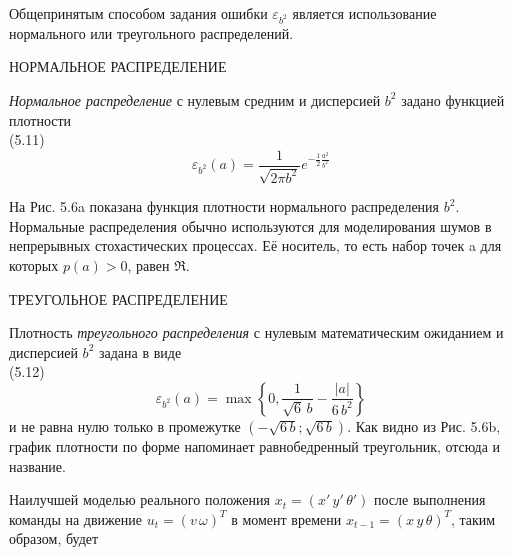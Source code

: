 \documentclass[10pt,a4paper]{article}
\begin{document}
Общепринятым способом задания ошибки $\varepsilon_{b^2}$ является использование нормального или треугольного распределений.

НОРМАЛЬНОЕ РАСПРЕДЕЛЕНИЕ
 
\textit{Нормальное распределение} с нулевым средним и дисперсией $b^2$ задано функцией плотности\\

(5.11)
$$\varepsilon_{b^2}(a)=\frac{1}{\sqrt{2\pi b^2}}e^{-\frac{1}{2}\frac{a^2}{b^2}}$$

На Рис. 5.6a показана функция плотности нормального распределения
$b^2$. Нормальные распределения обычно используются для моделирования шумов в непрерывных стохастических процессах. Её носитель, то есть набор точек a для которых $p(a) > 0$, равен $\Re$.
 
ТРЕУГОЛЬНОЕ РАСПРЕДЕЛЕНИЕ

Плотность \textit{треугольного распределения} с нулевым математическим ожиданием и дисперсией $b^2$ задана в виде\\

(5.12)
$$\varepsilon_{b^2}(a)=\max\left\lbrace 0,\frac{1}{\sqrt{6}\,b}-\frac{|a|}{6\,b^2}\right\rbrace$$ 
и не равна нулю только в промежутке $(-\sqrt{6\,b};\sqrt{6\,b})$. Как видно из Рис. 5.6b, график плотности по форме напоминает равнобедренный треугольник, отсюда и название.

Наилучшей моделью реального положения $x_t=(x'\,y'\,\theta')$ после выполнения команды на движение $u_t = (v\,\omega)^T$ в момент времени $x_{t-1} = (x\,y\,\theta)^T$, таким образом, будет \\
\end{document}
